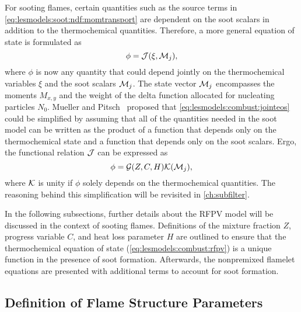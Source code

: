 For sooting flames, certain quantities such as the source terms in \cref{eq:lesmodels:soot:ndf:momtransport} are dependent on the soot scalars in addition to the thermochemical quantities. Therefore, a more general equation of state is formulated as~\cite{mueller2012}
\begin{equation}\label{eq:lesmodels:combust:jointeos}
  \phi = \mathcal{J}(\xi, \mathcal{M}_j),
\end{equation}
where $\phi$ is now any quantity that could depend jointly on the thermochemical variables $\xi$ and the soot scalars $\mathcal{M}_j$. The state vector $\mathcal{M}_j$ encompasses the moments $M_{x,y}$ and the weight of the delta function allocated for nucleating particles $N_0$. Mueller and Pitsch~\cite{subfilterpdf2011} proposed that \cref{eq:lesmodels:combust:jointeos} could be simplified by assuming that all of the quantities needed in the soot model can be written as the product of a function that depends only on the thermochemical state and a function that depends only on the soot scalars. Ergo, the functional relation $\mathcal{J}$ can be expressed as~\cite{mueller2012}
\begin{equation}\label{eq:lesmodels:combust:producteos}
  \phi = \mathcal{G}(Z, C, H)\mathcal{K}(\mathcal{M}_j),
\end{equation}
where $\mathcal{K}$ is unity if $\phi$ solely depends on the thermochemical quantities. The reasoning behind this simplification will be revisited in \cref{ch:subfilter}.

In the following subsections, further details about the RFPV model will be discussed in the context of sooting flames. Definitions of the mixture fraction $Z$, progress variable $C$, and heat loss parameter $H$ are outlined to ensure that the thermochemical equation of state (\cref{eq:lesmodels:combust:rfpv}) is a unique function in the presence of soot formation. Afterwards, the nonpremixed flamelet equations are presented with additional terms to account for soot formation.


\subsection{Definition of Flame Structure Parameters}
\label{sec:lesmodels:combust:map}

